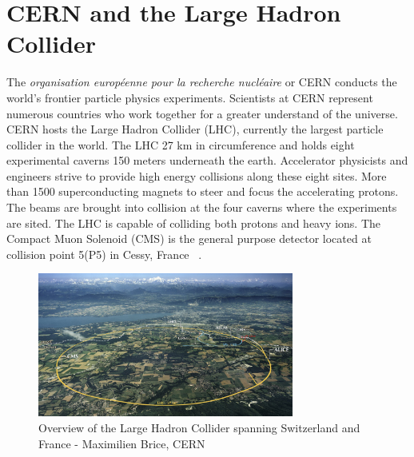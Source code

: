 \section{CERN and the Large Hadron Collider}
The \textit{organisation européenne pour la recherche nucléaire} or CERN conducts the world's frontier particle physics experiments. 
Scientists at CERN represent numerous countries who work together for a greater understand of the universe. 
CERN hosts the Large Hadron Collider (LHC), currently the largest particle collider in the world. The LHC 27 km in circumference and holds eight experimental caverns 150 meters underneath the earth. Accelerator physicists and engineers strive to provide high energy collisions along these eight sites. More than 1500 superconducting magnets to steer and focus the accelerating protons. 
The beams are brought into collision at the four caverns where the experiments are sited.
The LHC is capable of colliding both protons and heavy ions. 
The Compact Muon Solenoid (CMS) is the general purpose detector located at collision point 5(P5) in Cessy, France ~\cite{Bruning:782076}. 

\begin{figure}[ht!b]
  \centering
\includegraphics[width=0.75\textwidth]{figures/LHC_map-s.jpg}    
    \caption{\label{fig:lhc} Overview of the Large Hadron Collider spanning Switzerland and France - Maximilien Brice, CERN }
\end{figure}

